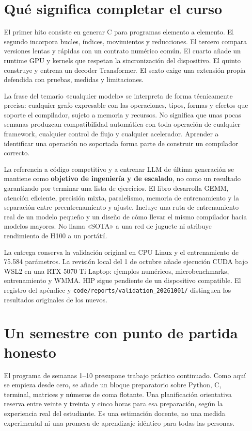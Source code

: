 \documentclass[12pt,a4paper,oneside]{report}
\begin{document}
\section{Qué significa completar el curso}
El primer hito consiste en generar C para programas elemento a elemento. El segundo incorpora bucles, índices, movimientos y reducciones. El tercero compara versiones lentas y rápidas con un contrato numérico común. El cuarto añade un runtime GPU y kernels que respetan la sincronización del dispositivo. El quinto construye y entrena un decoder Transformer. El sexto exige una extensión propia defendida con pruebas, medidas y limitaciones.

La frase del temario «cualquier modelo» se interpreta de forma técnicamente precisa: cualquier grafo expresable con las operaciones, tipos, formas y efectos que soporte el compilador, sujeto a memoria y recursos. No significa que unas pocas semanas produzcan compatibilidad automática con toda operación de cualquier framework, cualquier control de flujo y cualquier acelerador. Aprender a identificar una operación no soportada forma parte de construir un compilador correcto.

La referencia a código competitivo y a entrenar LLM de última generación se mantiene como \textbf{objetivo de ingeniería y de escalado}, no como un resultado garantizado por terminar una lista de ejercicios. El libro desarrolla GEMM, atención eficiente, precisión mixta, paralelismo, memoria de entrenamiento y la separación entre preentrenamiento y ajuste. Incluye una ruta de entrenamiento real de un modelo pequeño y un diseño de cómo llevar el mismo compilador hacia modelos mayores. No llama «SOTA» a una red de juguete ni atribuye rendimiento de H100 a un portátil.

\begin{cuidado}
La entrega conserva la validación original en CPU Linux y el entrenamiento de 75.584 parámetros. La revisión local del 1 de octubre añade ejecución CUDA bajo WSL2 en una RTX 5070 Ti Laptop: ejemplos numéricos, microbenchmarks, entrenamiento y WMMA. HIP sigue pendiente de un dispositivo compatible. El registro del apéndice y \texttt{code/reports\allowbreak{}/validation\_\allowbreak{}20261001/} distinguen los resultados originales de los nuevos.

\end{cuidado}
\section{Un semestre con punto de partida honesto}
El programa de semanas 1--10 presupone trabajo práctico continuado. Como aquí se empieza desde cero, se añade un bloque preparatorio sobre Python, C, terminal, matrices y números de coma flotante. Una planificación orientativa reserva entre veinte y treinta y cinco horas para esa preparación, según la experiencia real del estudiante. Es una estimación docente, no una medida experimental ni una promesa de aprendizaje idéntico para todas las personas.
\end{document}
